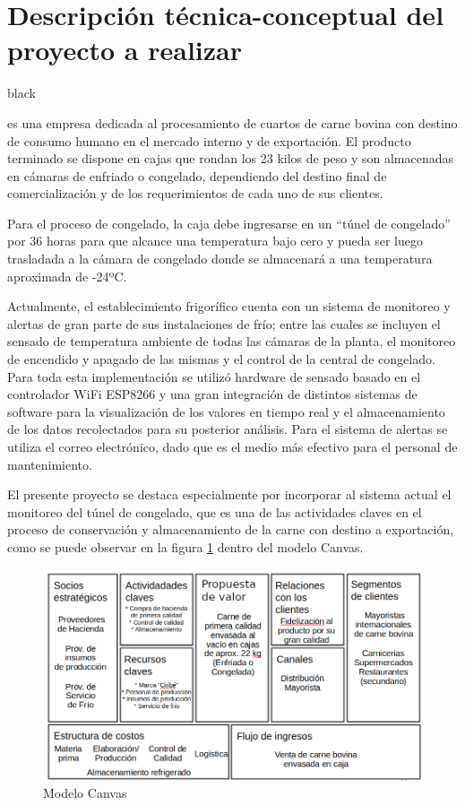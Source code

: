 \documentclass[
11pt, %
]{charter}
\begin{document}
\section{Descripción técnica-conceptual del proyecto a realizar}
\label{sec:descripcion}

\begin{consigna}{black}

\empclientename es una empresa dedicada al procesamiento de cuartos de carne bovina con destino de consumo humano en el mercado interno y de exportación. El producto terminado se dispone en cajas que rondan los 23 kilos de peso y son almacenadas en cámaras de enfriado o congelado, dependiendo del destino final de comercialización y de los requerimientos de cada uno de sus clientes.

Para el proceso de congelado, la caja debe ingresarse en un “túnel de congelado” por 36 horas para que alcance una temperatura bajo cero y pueda ser luego trasladada a la cámara de congelado donde se almacenará a una temperatura aproximada de -24ºC.

Actualmente, el establecimiento frigorífico cuenta con un sistema de monitoreo y alertas de gran parte de sus instalaciones de frío; entre las cuales se incluyen el sensado de temperatura ambiente de todas las cámaras de la planta, el monitoreo de encendido y apagado de las mismas y el control de la central de congelado. Para toda esta implementación se utilizó hardware de sensado basado en el controlador WiFi ESP8266 y una gran integración de distintos sistemas de software para la visualización de los valores en tiempo real y el almacenamiento de los datos recolectados para su posterior análisis. Para el sistema de alertas se utiliza el correo electrónico, dado que es el medio más efectivo para el personal de mantenimiento.

El presente proyecto se destaca especialmente por incorporar al sistema actual el monitoreo del túnel de congelado, que es una de las actividades claves en el proceso de conservación y almacenamiento de la carne con destino a exportación, como se puede observar en la figura \ref{fig:canvasdone} dentro del modelo Canvas. 

\begin{figure}[htpb]
\centering 
\includegraphics[width=.75\textwidth]{./Figuras/canvasdone.png}
\caption{Modelo Canvas}
\label{fig:canvasdone}
\end{figure}


\end{consigna}
\end{document}
